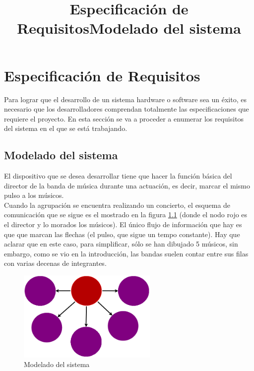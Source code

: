 \chapter{Especificación de Requisitos}
\label{cap:EspecificaciondeRequisitos}
\title{Especificación de Requisitos}

Para lograr que el desarrollo de un sistema hardware o software sea un éxito,
es necesario que los desarrolladores comprendan totalmente las especificaciones que
requiere el proyecto. En esta sección se va a proceder a enumerar los requisitos del
sistema en el que se está trabajando.\\

\title{Modelado del sistema}
\section{
Modelado del sistema
}

El dispositivo que se desea desarrollar tiene que hacer la función básica
del director de la banda de música durante una actuación, es decir,
marcar el mismo pulso a los músicos.\\

Cuando la agrupación se encuentra realizando un concierto, el
esquema de comunicación que se sigue es el mostrado en la figura \ref{fig:modeladoconceptual}
(donde el nodo rojo es el director y lo morados los músicos). El único flujo de información
que hay es que que marcan las flechas (el pulso, que sigue un tempo constante). Hay que
aclarar que en este caso, para simplificar, sólo se han dibujado 5 músicos,
sin embargo, como se vio en la introducción, las bandas suelen contar entre sus filas con
varias decenas de integrantes.\\


\begin{figure}[htb]
\centering
\includegraphics[width=0.6\textwidth]{./imagenes/modeladoconceptual}
\caption{Modelado del sistema} \label{fig:modeladoconceptual}
\end{figure}

